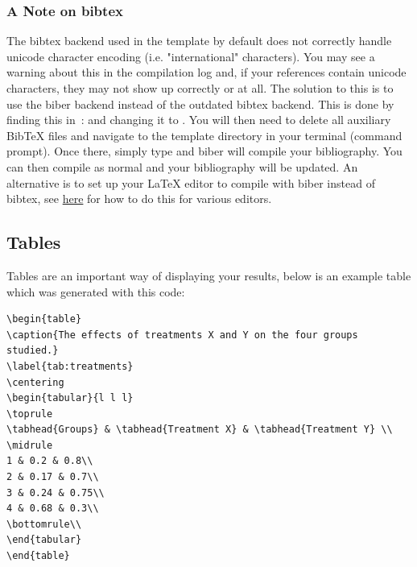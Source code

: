 \subsubsection{A Note on bibtex}

The bibtex backend used in the template by default does not correctly handle unicode character encoding (i.e. "international" characters). You may see a warning about this in the compilation log and, if your references contain unicode characters, they may not show up correctly or at all. The solution to this is to use the biber backend instead of the outdated bibtex backend. This is done by finding this in~:  and changing it to . You will then need to delete all auxiliary BibTeX files and navigate to the template directory in your terminal (command prompt). Once there, simply type  and biber will compile your bibliography. You can then compile  as normal and your bibliography will be updated. An alternative is to set up your LaTeX editor to compile with biber instead of bibtex, see \href{http://tex.stackexchange.com/questions/154751/biblatex-with-biber-configuring-my-editor-to-avoid-undefined-citations/}{here} for how to do this for various editors.

\subsection{Tables}

Tables are an important way of displaying your results, below is an example table which was generated with this code:

{\small
\begin{verbatim}
\begin{table}
\caption{The effects of treatments X and Y on the four groups studied.}
\label{tab:treatments}
\centering
\begin{tabular}{l l l}
\toprule
\tabhead{Groups} & \tabhead{Treatment X} & \tabhead{Treatment Y} \\
\midrule
1 & 0.2 & 0.8\\
2 & 0.17 & 0.7\\
3 & 0.24 & 0.75\\
4 & 0.68 & 0.3\\
\bottomrule\\
\end{tabular}
\end{table}
\end{verbatim}
}

